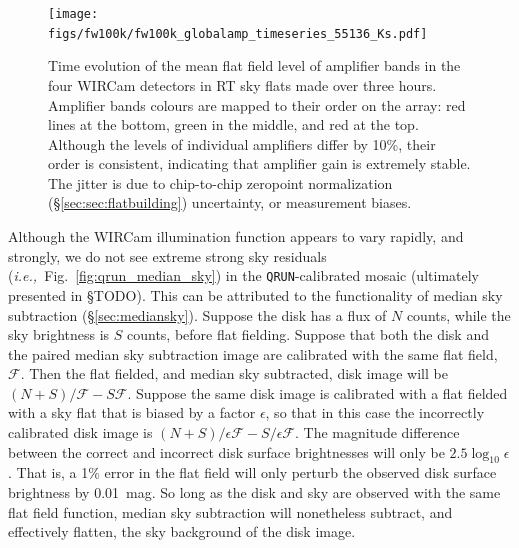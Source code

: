 \documentclass[iop]{emulateapj}
\newcommand{\ie}{\textit{i.e.,~}}
\newcommand{\todo}[1]{\textcolor{RedOrange}{#1}} %
\newcommand{\Fig}[1]{Fig.~\ref{fig:#1}}  %
\newcommand{\Sec}[1]{\S\ref{sec:#1}}  %
\begin{document}
\begin{figure}[t]
\centering
\texttt{[image: figs/fw100k/fw100k\_globalamp\_timeseries\_55136\_Ks.pdf]}
\caption{Time evolution of the mean flat field level of amplifier bands in the four WIRCam detectors in RT sky flats made over three hours. Amplifier bands colours are mapped to their order on the array: red lines at the bottom, green in the middle, and red at the top. Although the levels of individual amplifiers differ by 10\%, their order is consistent, indicating that amplifier gain is extremely stable. The jitter is due to chip-to-chip zeropoint normalization (\Sec{sec:flatbuilding}) uncertainty, or measurement biases.}
\label{fig:fw100k_globalamp_timeseries_55136_Ks}
\end{figure}




Although the WIRCam illumination function appears to vary rapidly, and strongly, we do not see extreme strong sky residuals (\ie \Fig{qrun_median_sky}) in the \texttt{QRUN}-calibrated mosaic (ultimately presented in \todo{\S TODO}).
This can be attributed to the functionality of median sky subtraction (\Sec{mediansky}).
Suppose the disk has a flux of $N$ counts, while the sky brightness is $S$ counts, before flat fielding.
Suppose that both the disk and the paired median sky subtraction image are calibrated with the same flat field, $\mathcal{F}$.
Then the flat fielded, and median sky subtracted, disk image will be $(N + S)/\mathcal{F} - S \mathcal{F}$.
Suppose the same disk image is calibrated with a flat fielded with a sky flat that is biased by a factor $\epsilon$, so that in this case the incorrectly calibrated disk image is $(N + S) / \epsilon \mathcal{F} - S / \epsilon \mathcal{F}$.
The magnitude difference between the correct and incorrect disk surface brightnesses will only be $2.5 \log_{10} \epsilon$.
That is, a 1\% error in the flat field will only perturb the observed disk surface brightness by 0.01~mag.
So long as the disk and sky are observed with the same flat field function, median sky subtraction will nonetheless subtract, and effectively flatten, the sky background of the disk image.
\end{document}
